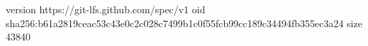 version https://git-lfs.github.com/spec/v1
oid sha256:b61a2819ceac53c43e0c2c028c7499b1c0f55fcb99cc189c34494fb355ec3a24
size 43840
